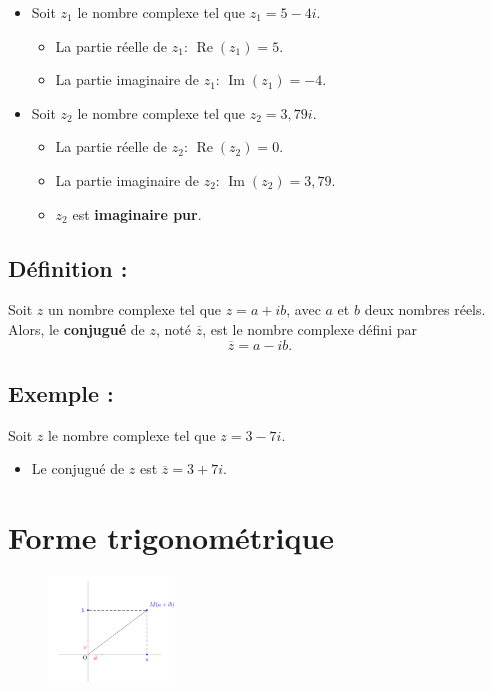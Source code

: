\documentclass[a4paper,12pt]{article}
\begin{document}
    \begin{itemize}
        \item Soit $z_1$ le nombre complexe tel que $z_1 = 5 - 4i$.
        \begin{itemize}
            \item La partie réelle de $z_1$: $\operatorname{Re}(z_1) = 5$.
            \item La partie imaginaire de $z_1$: $\operatorname{Im}(z_1) = -4$.
        \end{itemize}

        \item Soit $z_2$ le nombre complexe tel que $z_2 = 3,79i$.
        \begin{itemize}
            \item La partie réelle de $z_2$: $\operatorname{Re}(z_2) = 0$.
            \item La partie imaginaire de $z_2$: $\operatorname{Im}(z_2) = 3,79$.
            \item $z_2$ est \textbf{imaginaire pur}.
        \end{itemize}
    \end{itemize}

    \subsection{Définition :}
    Soit $z$ un nombre complexe tel que $z = a + ib$, avec $a$ et $b$ deux nombres réels. Alors, le \textbf{conjugué} de $z$, noté $\overline{z}$, est le nombre complexe défini par
    \[
        \overline{z} = a - ib.
    \]

    \subsection{Exemple :}

    Soit $z$ le nombre complexe tel que $z = 3 - 7i$.

    \begin{itemize}
        \item Le conjugué de $z$ est $\overline{z} = 3 + 7i$.
    \end{itemize}

    \section{Forme trigonométrique}
    \begin{figure}[h]
        \centering
        \includegraphics[width=0.3\textwidth]{formealgebrique.png}
        \label{fig:formealgebrique}
    \end{figure}
\end{document}
